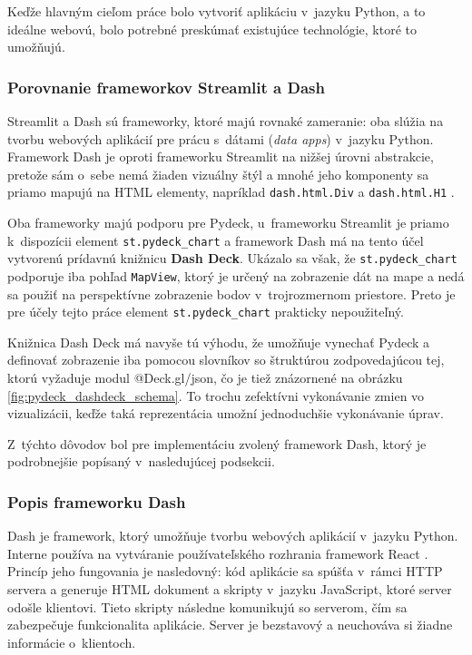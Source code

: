 Keďže hlavným cieľom práce bolo vytvoriť aplikáciu v~jazyku Python, a to ideálne webovú, bolo potrebné preskúmať existujúce technológie, ktoré to umožňujú.

\subsubsection{Porovnanie frameworkov Streamlit a Dash}

Streamlit a Dash sú frameworky, ktoré majú rovnaké zameranie: oba slúžia na tvorbu webových aplikácií pre prácu s~dátami (\emph{data apps}) v~jazyku Python. Framework Dash je oproti frameworku Streamlit na nižšej úrovni abstrakcie, pretože sám o~sebe nemá žiaden vizuálny štýl a mnohé jeho komponenty sa priamo mapujú na HTML elementy, napríklad \texttt{dash.html.Div} a \texttt{dash.html.H1} \cite{dash_documentation, streamlit_documentation}.

Oba frameworky majú podporu pre Pydeck, u~frameworku Streamlit je priamo k~dispozícii element \texttt{st.pydeck\_chart} a framework Dash má na tento účel vytvorenú prídavnú knižnicu \textbf{Dash Deck}. Ukázalo sa však, že \texttt{st.pydeck\_chart} podporuje iba pohľad \texttt{MapView}, ktorý je určený na zobrazenie dát na mape a nedá sa použiť na perspektívne zobrazenie bodov v~trojrozmernom priestore. Preto je pre účely tejto práce element \texttt{st.pydeck\_chart} prakticky nepoužiteľný.

Knižnica Dash Deck má navyše tú výhodu, že umožňuje vynechať Pydeck a definovať zobrazenie iba pomocou slovníkov so štruktúrou zodpovedajúcou tej, ktorú vyžaduje modul @Deck.gl/json, čo je tiež znázornené na obrázku \ref{fig:pydeck_dashdeck_schema}. To trochu zefektívni vykonávanie zmien vo vizualizácii, keďže taká reprezentácia umožní jednoduchšie vykonávanie úprav.

Z~týchto dôvodov bol pre implementáciu zvolený framework Dash, ktorý je podrobnejšie popísaný v~nasledujúcej podsekcii.

\subsubsection{Popis frameworku Dash}

Dash je framework, ktorý umožňuje tvorbu webových aplikácií v~jazyku Python. Interne používa na vytváranie používateľského rozhrania framework React \cite{dash_documentation}. Princíp jeho fungovania je nasledovný: kód aplikácie sa spúšťa v~rámci HTTP servera a generuje HTML dokument a skripty v~jazyku JavaScript, ktoré server odošle klientovi. Tieto skripty následne komunikujú so serverom, čím sa zabezpečuje funkcionalita aplikácie. Server je bezstavový a neuchováva si žiadne informácie o~klientoch.

